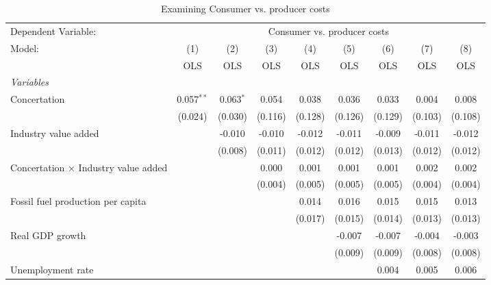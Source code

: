 
\begin{table}[htbp]
   \caption{Examining Consumer vs. producer costs}
   \centering
   \begin{tabular}{lcccccccc}
      \toprule
      Dependent Variable: & \multicolumn{8}{c}{Consumer vs. producer costs}\\
      Model:                                      & (1)          & (2)         & (3)     & (4)     & (5)     & (6)     & (7)     & (8)\\  
                                                  &  OLS         & OLS         & OLS     & OLS     & OLS     & OLS     & OLS     & OLS\\  
      \midrule
      \emph{Variables}\\
      Concertation                                & 0.057$^{**}$ & 0.063$^{*}$ & 0.054   & 0.038   & 0.036   & 0.033   & 0.004   & 0.008\\   
                                                  & (0.024)      & (0.030)     & (0.116) & (0.128) & (0.126) & (0.129) & (0.103) & (0.108)\\   
      Industry value added                        &              & -0.010      & -0.010  & -0.012  & -0.011  & -0.009  & -0.011  & -0.012\\   
                                                  &              & (0.008)     & (0.011) & (0.012) & (0.012) & (0.013) & (0.012) & (0.012)\\   
      Concertation $\times$ Industry value added  &              &             & 0.000   & 0.001   & 0.001   & 0.001   & 0.002   & 0.002\\   
                                                  &              &             & (0.004) & (0.005) & (0.005) & (0.005) & (0.004) & (0.004)\\   
      Fossil fuel production per capita           &              &             &         & 0.014   & 0.016   & 0.015   & 0.015   & 0.013\\   
                                                  &              &             &         & (0.017) & (0.015) & (0.014) & (0.013) & (0.013)\\   
      Real GDP growth                             &              &             &         &         & -0.007  & -0.007  & -0.004  & -0.003\\   
                                                  &              &             &         &         & (0.009) & (0.009) & (0.008) & (0.008)\\   
      Unemployment rate                           &              &             &         &         &         & 0.004   & 0.005   & 0.006\\   

\end{tabular}
\end{table}
